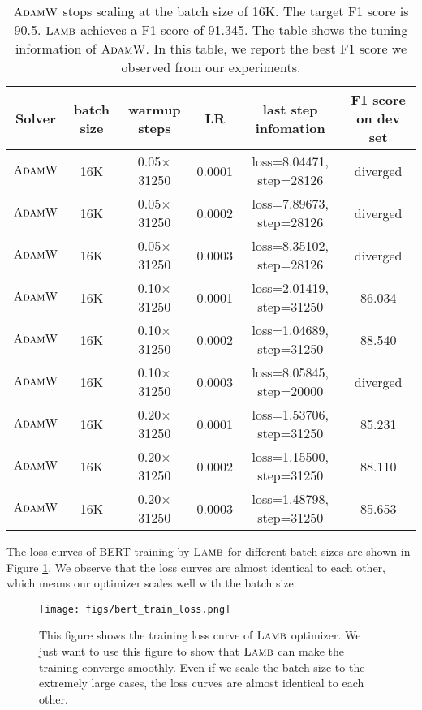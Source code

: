 \documentclass{article} \usepackage{iclr2020_conference,times}
\newcommand{\adamw}{\textsc{AdamW}}
\newcommand{\lamb}{\textsc{Lamb}}
\begin{document}
\begin{table}[ht]
\renewcommand{\arraystretch}{1.3}
\caption{ $\adamw$ stops scaling at the batch size of 16K. The target F1 score is 90.5. $\lamb$ achieves a F1 score of 91.345. The table shows the tuning information of $\adamw$. In this table, we report the best F1 score we observed from our experiments.}
\centering
\begin{tabular}{|c|c|c|c|c|c|}
\hline
Solver & batch size & warmup steps & LR & last step infomation & F1 score on dev set\\
\hline
\hline
$\adamw$ & 16K & 0.05$\times$31250 & 0.0001 & loss=8.04471, step=28126 & diverged\\
\hline
$\adamw$ & 16K & 0.05$\times$31250 & 0.0002 & loss=7.89673, step=28126 & diverged\\
\hline
$\adamw$ & 16K & 0.05$\times$31250 & 0.0003 & loss=8.35102, step=28126 & diverged\\
\hline
$\adamw$ & 16K & 0.10$\times$31250 & 0.0001 & loss=2.01419, step=31250 & 86.034 \\
\hline
$\adamw$ & 16K & 0.10$\times$31250 & 0.0002 & loss=1.04689, step=31250 & 88.540 \\
\hline
$\adamw$ & 16K & 0.10$\times$31250 & 0.0003 & loss=8.05845, step=20000 & diverged \\
\hline
$\adamw$ & 16K & 0.20$\times$31250 & 0.0001 & loss=1.53706, step=31250 & 85.231 \\
\hline
$\adamw$ & 16K & 0.20$\times$31250 & 0.0002 & loss=1.15500, step=31250 & 88.110 \\
\hline
$\adamw$ & 16K & 0.20$\times$31250 & 0.0003 & loss=1.48798, step=31250 & 85.653 \\
\hline
\end{tabular}
\label{table:adamw_16k}
\end{table}

The loss curves of BERT training by $\lamb$ for different batch sizes are shown in Figure \ref{fig:bert_train_loss}.
We observe that the loss curves are almost identical to each other, which means our optimizer scales well with the batch size. 

\begin{figure*}[tb]
\vspace{5pt}
\centering
\texttt{[image: figs/bert\_train\_loss.png]}
\caption{This figure shows the training loss curve of $\lamb$ optimizer. We just want to use this figure to show that $\lamb$ can make the training converge smoothly. Even if we scale the batch size to the extremely large cases, the loss curves are almost identical to each other.}
\label{fig:bert_train_loss}
\vspace{-10pt}
\end{figure*}
\end{document}

